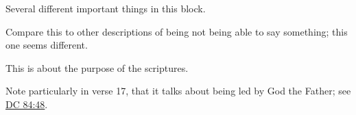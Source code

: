 \begin{compactdesc}
			\item[{\hyperref[3NEPHI-27-1]{3 Nephi 27:1--2}}] \phantom{.}
			\item[{\hyperref[3NEPHI-28-11]{3 Nephi 28:11}}]
			\item[{\hyperref[3NEPHI-28-12]{3 Nephi 28:12--16}}]
			\item[{\hyperref[3NEPHI-28-29]{3 Nephi 28:29}}]
			\item[{\hyperref[3NEPHI-28-30]{3 Nephi 28:30}}]
			\item[{\hyperref[3NEPHI-28-34]{3 Nephi 28:34--35}}]
			\item[{\hyperref[3NEPHI-29-6]{3 Nephi 29:6}}]
			\item[{\hyperref[4NEPHI-1-38]{4 Nephi 1:38--39}}]
			\item[{\hyperref[MORMON-1-14]{Mormon 1:14--17}}] \phantom{.}
				\begin{compactitem}
					\item Several different important things in this block.
				\end{compactitem}
			\item[{\hyperref[MORMON-2-26]{Mormon 2:26}}]
			\item[{\hyperref[MORMON-3-16]{Mormon 3:16}}]
			\item[{\hyperref[MORMON-3-20]{Mormon 3:20--21}}]
			\item[{\hyperref[MORMON-4-11]{Mormon 4:11}}] \phantom{.}
				\begin{compactitem}
					\item Compare this to other descriptions of being not being able to say something; this one seems different.
				\end{compactitem}
			\item[{\hyperref[MORMON-5-8]{Mormon 5:8--9}}]
			\item[{\hyperref[MORMON-5-12]{Mormon 5:12--15}}] \phantom{.}
				\begin{compactitem}
					\item This is about the purpose of the scriptures.
				\end{compactitem}
			\item[{\hyperref[MORMON-5-16]{Mormon 5:16--18}}] \phantom{.}
				\begin{compactitem}
					\item Note particularly in verse 17, that it talks about being led by God the Father; see \hyperref[DC84-48]{DC 84:48}.
				\end{compactitem}
			\item[{\hyperref[MORMON-8-12]{Mormon 8:12}}]

\end{compactdesc}
